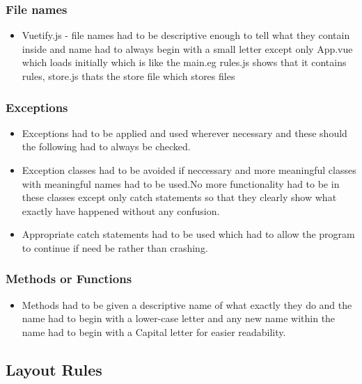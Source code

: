 \documentclass[12pt]{article}
\begin{document}
   \subsubsection{File names}
    \begin{itemize} 
  		\item Vuetify.js - file names had to be descriptive enough to tell what they contain inside and name had to always 	begin with a small letter except only App.vue which loads initially which is like the main.eg rules.js shows that it contains rules, store.js thats the store file which stores files
	\end{itemize}
	\subsubsection{Exceptions}
 	\begin{itemize} 
 		\item Exceptions had to be applied and used wherever necessary and these should the following had to always be checked.
 		\item Exception classes had to be avoided if neccessary and more meaningful classes with meaningful names had to be used.No more functionality had to be in these classes except only catch 	statements so that they clearly show what exactly have happened without any confusion.
 		\item Appropriate catch statements had to be used which had to allow the program to continue if need be rather than crashing.
	\end{itemize}
	
	\subsubsection{Methods or Functions}
  \begin{itemize}
 	\item Methods had to be given a descriptive name of what exactly they do and the name had to begin with a lower-case letter and any new name 	within the name had to begin with a Capital letter for easier readability.
 	\end{itemize}  
 	
 	\subsection{Layout Rules}
\end{document}
